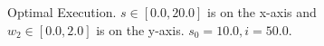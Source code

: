 \begin{figure}[h!]
    \centering
    \caption{Optimal Execution. $ s \in \left[ 0.0, 20.0 \right]$ is on the x-axis and $ w_2 \in \left[ 0.0, 2.0 \right]$ is on the y-axis. $ s_0 = 10.0, i = 50.0$.}
    \label{fig:robot1d}
\end{figure}

